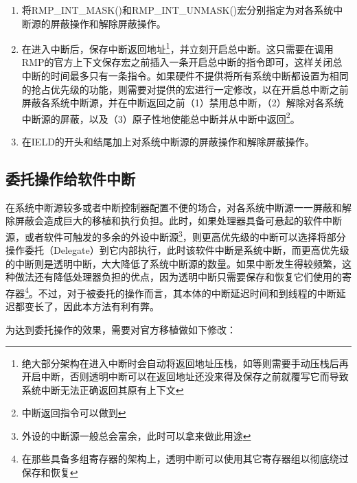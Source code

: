 \begin{enumerate}
\def\labelenumi{\arabic{enumi}.}
\item
  将RMP\_INT\_MASK()和RMP\_INT\_UNMASK()宏分别指定为对各系统中断源的屏蔽操作和解除屏蔽操作。
\item
  在进入中断后，保存中断返回地址\footnote{绝大部分架构在进入中断时会自动将返回地址压栈，如等则需要手动压栈后再开启中断，否则透明中断可以在返回地址还没来得及保存之前就覆写它而导致系统中断无法正确返回其原有上下文}，并立刻开启总中断。这只需要在调用RMP的官方上下文保存宏之前插入一条开启总中断的指令即可，这样关闭总中断的时间最多只有一条指令。如果硬件不提供将所有系统中断都设置为相同的抢占优先级的功能，则需要对提供的宏进行一定修改，以在开启总中断之前屏蔽各系统中断源，并在中断返回之前（1）禁用总中断，（2）解除对各系统中断源的屏蔽，以及（3）原子性地使能总中断并从中断中返回\footnote{中断返回指令可以做到}。
\item
  在IELD的开头和结尾加上对系统中断源的屏蔽操作和解除屏蔽操作。
\end{enumerate}

\subsection{委托操作给软件中断}\label{subsec:delegating-operations-to-a-software-interrupt}

\protect{}\label{subsec:delegating-operations-to-a-software-interrupt-2}在系统中断源较多或者中断控制器配置不便的场合，对各系统中断源一一屏蔽和解除屏蔽会造成巨大的移植和执行负担。此时，如果处理器具备可悬起的软件中断源，或者软件可触发的多余的外设中断源\footnote{外设的中断源一般总会富余，此时可以拿来做此用途}，则更高优先级的中断可以选择将部分操作委托（Delegate）到它内部执行，此时该软件中断是系统中断，而更高优先级的中断则是透明中断，大大降低了系统中断源的数量。如果中断发生得较频繁，这种做法还有降低处理器负担的优点，因为透明中断只需要保存和恢复它们使用的寄存器\footnote{在那些具备多组寄存器的架构上，透明中断可以使用其它寄存器组以彻底绕过保存和恢复}。不过，对于被委托的操作而言，其本体的中断延迟时间和到线程的中断延迟都变长了，因此本方法有利有弊。

为达到委托操作的效果，需要对官方移植做如下修改：


